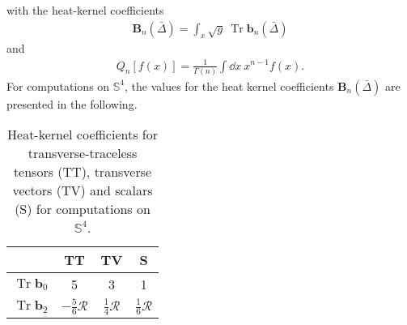 with the heat-kernel coefficients 
\begin{align}
	\mathbf{B}_{n}(\bar{\Delta})=\int_x  \sqrt{g} \  \operatorname{Tr} \mathbf{b}_{n}(\bar{\Delta})
\end{align}
and 
\begin{align}
	Q_{n}[f(x)]=\frac{1}{\Gamma(n)} \int \dd x \ x^{n-1} f(x).\label{eqn:Qfunc}
\end{align}
For computations on $\mathbb{S}^4$, the values for the heat kernel coefficients $\mathbf{B}_n(\bar{\Delta})$ are presented in the following.
\begin{table}[H]
	\centering
	\setlength{\tabcolsep}{5mm}
	\setlength\extrarowheight{2mm}
	\begin{tabular}{c | c c c}
	   & TT & TV & S\\ \hline
	   $\operatorname{Tr} \mathbf{b}_{0}$ & 5 &  3 & 1\\
	  $\operatorname{Tr} \mathbf{b}_{2}$ & $-\frac{5}{6}\mathcal{R}$ & $\frac{1}{4}\mathcal{R}$& $\frac{1}{6}\mathcal{R}$\\
	\end{tabular}
	\caption{Heat-kernel coefficients for transverse-traceless tensors (TT), transverse vectors (TV) and scalars (S) for computations on $\mathbb{S}^4$.}
\end{table}

